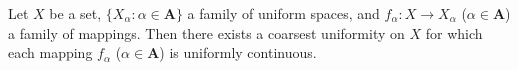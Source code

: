 Let $X$ be a set, $\{X_\alpha : \alpha \in \mathbf{A}\}$ a family of uniform spaces, and $f_\alpha : X \to X_\alpha$ ($\alpha \in \mathbf{A}$) a family of mappings. Then there exists a coarsest uniformity on $X$ for which each mapping $f_\alpha$ ($\alpha \in \mathbf{A}$) is uniformly continuous.
